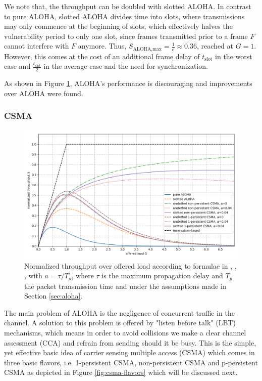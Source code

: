 We note that, the throughput can be doubled with slotted ALOHA. In contrast to pure ALOHA, slotted ALOHA divides time into slots, where transmissions may only commence at the beginning of slots, which effectively halves the vulnerability period to only one slot, since frames transmitted prior to a frame $F$ cannot interfere with $F$ anymore. Thus, $S_\text{ALOHA,max} = \frac{1}{e} \approx 0.36$, reached at $G=1$. However, this comes at the cost of an additional frame delay of $t_\text{slot}$ in the worst case and $\frac{t_\text{slot}}{2}$ in the average case and the need for synchronization. 

As shown in Figure \ref{fig:aloha-csma-performance}, ALOHA's performance is discouraging and improvements over ALOHA were found. 

\subsubsection{CSMA}
\label{sec:csma}

\begin{figure}[tb]
	\label{fig:aloha-csma-performance}
	\begin{center}
		\includegraphics[width=\textwidth]{pictures/aloha_csma_performance}
	\end{center}
	\caption[Normalized throughput over offerered load for various ALOHA and CSMA variants.]{Normalized throughput over offered load according to formulae in \cite{Tanenbaum02}, \cite{Garg07}, \cite{Bachir10}, with $a=\tau/T_p$, where $\tau$ is the maximum propagation delay and $T_p$ the packet transmission time and under the assumptions made in Section \ref{sec:aloha}. }
\end{figure}

The main problem of ALOHA is the negligence of concurrent traffic in the channel. A solution to this problem is offered by "listen before talk" (LBT) mechanisms, which means in order to avoid collisions we make a clear channel assessment (CCA) and refrain from sending should it be busy. This is the simple, yet effective basic idea of carrier sensing multiple access (CSMA) which comes in three basic flavors, i.e. 1-persistent CSMA, non-persistent CSMA and p-persistent CSMA as depicted in Figure \ref{fig:csma-flavors} which will be discussed next.


